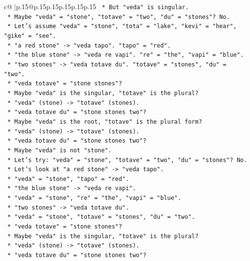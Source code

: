 \documentclass{article}
\begin{document}
{\begin{supertabular}{c@{$\;$}|p{.15\linewidth}@{}p{.15\linewidth}p{.15\linewidth}p{.15\linewidth}p{.15\linewidth}p{.15\linewidth}}
{{{\texttt{    *   But "veda" is singular.} \\
\texttt{    *   Maybe "veda" = "stone", "totave" = "two", "du" = "stones"? No.} \\
\texttt{    *   Let's assume "veda" = "stone", "tota" = "lake", "kevi" = "hear", "gike" = "see".} \\
\texttt{    *   "a red stone" {-}> "veda tapo". "tapo" = "red".} \\
\texttt{    *   "the blue stone" {-}> "veda re vapi". "re" = "the", "vapi" = "blue".} \\
\texttt{    *   "two stones" {-}> "veda totave du". "totave" = "stones", "du" = "two".} \\
\texttt{    *   "veda totave" = "stone stones"?} \\
\texttt{    *   Maybe "veda" is the singular, "totave" is the plural?} \\
\texttt{    *   "veda" (stone) {-}> "totave" (stones).} \\
\texttt{    *   "veda totave du" = "stone stones two"?} \\
\texttt{    *   Maybe "veda" is the root, "totave" is the plural form?} \\
\texttt{    *   "veda" (stone) {-}> "totave" (stones).} \\
\texttt{    *   "veda totave du" = "stone stones two"?} \\
\texttt{    *   Maybe "veda" is not "stone".} \\
\texttt{    *   Let's try: "veda" = "stone", "totave" = "two", "du" = "stones"? No.} \\
\texttt{    *   Let's look at "a red stone" {-}> "veda tapo".} \\
\texttt{    *   "veda" = "stone", "tapo" = "red".} \\
\texttt{    *   "the blue stone" {-}> "veda re vapi".} \\
\texttt{    *   "veda" = "stone", "re" = "the", "vapi" = "blue".} \\
\texttt{    *   "two stones" {-}> "veda totave du".} \\
\texttt{    *   "veda" = "stone", "totave" = "stones", "du" = "two".} \\
\texttt{    *   "veda totave" = "stone stones"?} \\
\texttt{    *   Maybe "veda" is the singular, "totave" is the plural?} \\
\texttt{    *   "veda" (stone) {-}> "totave" (stones).} \\
\texttt{    *   "veda totave du" = "stone stones two"?} \\
}}}
\end{supertabular}}
\end{document}
